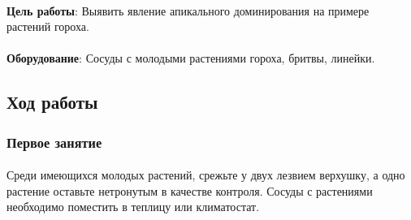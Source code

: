 



\paragraph*{}\textbf{Цель работы}: Выявить явление апикального доминирования на примере растений гороха.
\paragraph*{}\textbf{Оборудование}: Сосуды с молодыми растениями гороха, бритвы, линейки.

\subsection*{Ход работы}

	\subsubsection*{Первое занятие}
	
\paragraph*{}Среди имеющихся молодых растений, срежьте у двух  лезвием верхушку, а одно растение оставьте нетронутым в качестве контроля. Сосуды с растениями необходимо поместить в теплицу или климатостат.
	
